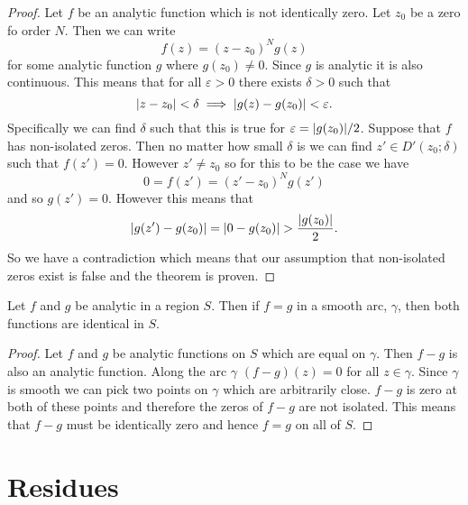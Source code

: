 \documentclass{article}
\newcommand{\discPunctured}[2]{D'\left({#1}; {#2}\right)}
\begin{document}
    \begin{proof}
        Let \(f\) be an analytic function which is not identically zero.
        Let \(z_0\) be a zero fo order \(N\).
        Then we can write
        \[f(z) = (z - z_0)^Ng(z)\]
        for some analytic function \(g\) where \(g(z_0)\ne 0\).
        Since \(g\) is analytic it is also continuous.
        This means that for all \(\varepsilon > 0\) there exists \(\delta>0\) such that
        \[\abs{z - z_0}<\delta \implies \abs{g(z) - g(z_0)} < \varepsilon.\]
        Specifically we can find \(\delta\) such that this is true for \(\varepsilon = \abs{g(z_0)}/2\).
        Suppose that \(f\) has non-isolated zeros.
        Then no matter how small \(\delta\) is we can find \(z'\in\discPunctured{z_0}{\delta}\) such that \(f(z') = 0\).
        However \(z' \ne z_0\) so for this to be the case we have
        \[0 = f(z') = (z' - z_0)^Ng(z')\]
        and so \(g(z') = 0\).
        However this means that
        \[\abs{g(z') - g(z_0)} = \abs{0 - g(z_0)} > \frac{\abs{g(z_0)}}{2}.\]
        So we have a contradiction which means that our assumption that non-isolated zeros exist is false and the theorem is proven.
    \end{proof}

    \begin{corollary}{}{}
        Let \(f\) and \(g\) be analytic in a region \(S\).
        Then if \(f = g\) in a smooth arc, \(\gamma\), then both functions are identical in \(S\).
    \end{corollary}
    \begin{proof}
        Let \(f\) and \(g\) be analytic functions on \(S\) which are equal on \(\gamma\).
        Then \(f - g\) is also an analytic function.
        Along the arc \(\gamma\) \((f - g)(z) = 0\) for all \(z\in\gamma\).
        Since \(\gamma\) is smooth we can pick two points on \(\gamma\) which are arbitrarily close.
        \(f - g\) is zero at both of these points and therefore the zeros of \(f - g\) are not isolated.
        This means that \(f - g\) must be identically zero and hence \(f = g\) on all of \(S\).
    \end{proof}

    \part{Residues}
\end{document}
